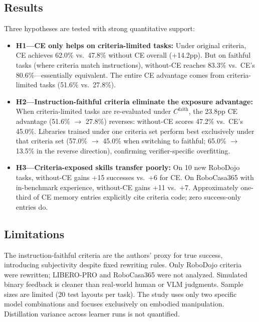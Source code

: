 \documentclass[11pt,a4paper]{article}
\begin{document}
\subsection{Results}
Three hypotheses are tested with strong quantitative support:

\begin{itemize}
  \item \textbf{H1---CE only helps on criteria-limited tasks:} Under original criteria, CE achieves 62.0\% vs.\ 47.8\% without CE overall (+14.2pp). But on faithful tasks (where criteria match instructions), without-CE reaches 83.3\% vs.\ CE's 80.6\%---essentially equivalent. The entire CE advantage comes from criteria-limited tasks (51.6\% vs.\ 27.8\%).
  \item \textbf{H2---Instruction-faithful criteria eliminate the exposure advantage:} When criteria-limited tasks are re-evaluated under $C^{\mathrm{faith}}$, the 23.8pp CE advantage (51.6\% $\to$ 27.8\%) reverses: without-CE scores 47.2\% vs.\ CE's 45.0\%. Libraries trained under one criteria set perform best exclusively under that criteria set (57.0\% $\to$ 45.0\% when switching to faithful; 65.0\% $\to$ 13.5\% in the reverse direction), confirming verifier-specific overfitting.
  \item \textbf{H3---Criteria-exposed skills transfer poorly:} On 10 new RoboDojo tasks, without-CE gains +15 successes vs.\ +6 for CE. On RoboCasa365 with in-benchmark experience, without-CE gains +11 vs.\ +7. Approximately one-third of CE memory entries explicitly cite criteria code; zero success-only entries do.
\end{itemize}

\subsection{Limitations}
The instruction-faithful criteria are the authors' proxy for true success, introducing subjectivity despite fixed rewriting rules. Only RoboDojo criteria were rewritten; LIBERO-PRO and RoboCasa365 were not analyzed. Simulated binary feedback is cleaner than real-world human or VLM judgments. Sample sizes are limited (20 test layouts per task). The study uses only two specific model combinations and focuses exclusively on embodied manipulation. Distillation variance across learner runs is not quantified.
\end{document}
